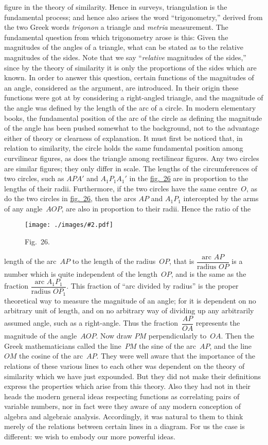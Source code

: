 \documentclass[12pt,leqno]{book}[2005/09/16]
\newcommand{\Graphic}[2]{%
  \phantomsection\label{fig:#2}%
  \texttt{[image: ./images/\#2.pdf]}%
}
\newcommand{\DefWidth}{4in}%
\newcommand{\Figure}[2][\DefWidth]{%
  \begin{figure}[hbt!]
    \centering
    \phantomsection\label{fig:#2}
    \Graphic{#1}{fig#2}
    \caption{Fig.~#2.}
  \end{figure}\ignorespaces%
}
\newcommand{\Fig}[2][Fig.]{\hyperref[fig:#2]{#1~#2}}
\newcommand{\PageSep}[1]{\ignorespaces}
\newcommand{\Foreign}[1]{\textit{#1}}
\begin{document}
figure in the theory of similarity. Hence in
surveys, triangulation is the fundamental
process; and hence also arises the word ``trigonometry,''
\PageSep{180}
%
derived from the two Greek
words \Foreign{trigonon} a triangle and \Foreign{metria} measurement.
The fundamental question from which
trigonometry arose is this: Given the magnitudes
of the angles of a triangle, what can be
stated as to the relative magnitudes of the
sides. Note that we say ``\emph{relative} magnitudes
of the sides,'' since by the theory of similarity
it is only the proportions of the sides which
are known. In order to answer this question,
certain functions of the magnitudes of
an angle, considered as the argument, are introduced.
In their origin these functions
were got at by considering a right-angled triangle,
and the magnitude of the angle was
defined by the length of the arc of a circle.
In modern elementary books, the fundamental
position of the arc of the circle as defining
the magnitude of the angle has been
pushed somewhat to the background, not to
the advantage either of theory or clearness
of explanation. It must first be noticed
that, in relation to similarity, the circle holds
the same fundamental position among curvilinear
figures, as does the triangle among
rectilinear figures. Any two circles are similar
figures; they only differ in scale. The
lengths of the circumferences of two circles,
such as $APA'$ and $A_{1} P_{1} A_{1}'$ in the \Fig[fig.]{26} are
in proportion to the lengths of their radii.
Furthermore, if the two circles have the same
\PageSep{181}
centre~$O$, as do the two circles in \Fig[fig.]{26}, then
the arcs $AP$ and $A_{1} P_{1}$ intercepted by the
arms of any angle~$AOP$, are also in proportion
to their radii. Hence the ratio of the
\Figure{26}
length of the arc~$AP$ to the length of the
radius~$OP$, that is $\dfrac{\text{arc } AP}{\text{radius } OP}$ is a number which
is quite independent of the length~$OP$, and is
the same as the fraction $\dfrac{\text{arc } A_{1} P_{1}}{\text{radius } OP_{1}}$. This fraction
of ``arc divided by radius'' is the proper
theoretical way to measure the magnitude of
\PageSep{182}
%
%
an angle; for it is dependent on no arbitrary
unit of length, and on no arbitrary way of
dividing up any arbitrarily assumed angle,
such as a right-angle. Thus the fraction~$\dfrac{AP}{OA}$
represents the magnitude of the angle~$AOP$.
Now draw $PM$ perpendicularly to~$OA$. Then
the Greek mathematicians called the line~$PM$
the sine of the arc~$AP$, and the line~$OM$ the
cosine of the arc~$AP$. They were well aware
that the importance of the relations of these
various lines to each other was dependent on
the theory of similarity which we have just
expounded. But they did not make their
definitions express the properties which arise
from this theory. Also they had not in their
heads the modern general ideas respecting
functions as correlating pairs of variable numbers,
nor in fact were they aware of any
modern conception of algebra and algebraic
analysis. Accordingly, it was natural to
them to think merely of the relations between
certain lines in a diagram. For us the case
is different: we wish to embody our more
powerful ideas.
\end{document}
